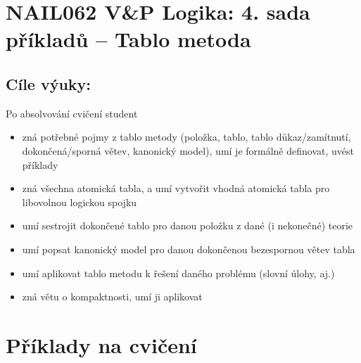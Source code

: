 \section*{NAIL062 V\&P Logika: 4. sada příkladů -- Tablo metoda}



\subsection*{Cíle výuky:} Po absolvování cvičení student

    \begin{itemize}\setlength{\itemsep}{0pt}
        \item zná potřebné pojmy z tablo metody (položka, tablo, tablo důkaz/zamítnutí, dokončená/sporná větev, kanonický model), umí je formálně definovat, uvést příklady
        \item zná všechna atomická tabla, a umí vytvořit vhodná atomická tabla pro libovolnou logickou spojku
        \item umí sestrojit dokončené tablo pro danou položku z dané (i nekonečné) teorie
        \item umí popsat kanonický model pro danou dokončenou bezespornou větev tabla
        \item umí aplikovat tablo metodu k řešení daného problému (slovní úlohy, aj.)
        \item zná větu o kompaktnosti, umí ji aplikovat
    \end{itemize}
    

\section*{Příklady na cvičení}


